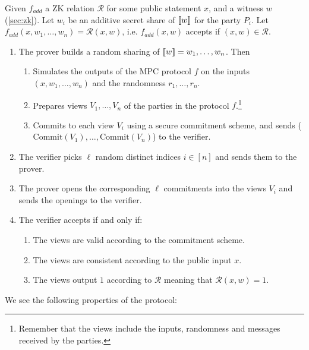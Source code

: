 \documentclass[11pt]{report}
\theoremstyle{definition}
\theoremstyle{plain}
\begin{document}
\begin{protocol}\label{def:mpcinth_basic}
  Given $f_{add}$ a ZK relation $\mathcal{R}$ for some public statement $x$, and a witness $w$ (\autoref{sec:zk}).
  Let $w_i$ be an additive secret share of $\llbracket w \rrbracket$ for the party $P_i$. Let $f_{add}(x, w_1, \dots, w_n) = \mathcal{R}(x, w)$, i.e. $f_{add}(x,w)$ accepts if $(x,w) \in \mathcal{R}$.

  \begin{enumerate}[parsep=2pt, itemsep=0pt]
    \item The prover builds a random sharing of $\llbracket w \rrbracket = w_1, \dots, w_n$. Then
          \begin{enumerate}[nolistsep]
            \item Simulates the outputs of the MPC protocol $f$ on the inputs $(x, w_1, \dots, w_n)$ and the randomness $r_1, \dots, r_n$.
            \item Prepares views $V_1, \dots, V_n$ of the parties in the protocol $f$.\footnote{Remember that the views include the inputs, randomness and messages received by the parties.}
            \item Commits to each view $V_i$ using a secure commitment scheme, and sends ($\text{Commit}(V_1), \dots, \text{Commit}(V_n)$) to the verifier.
          \end{enumerate}
    \item The verifier picks $\ell$ random distinct indices $i \in [n]$ and sends them to the prover.
    \item The prover opens the corresponding $\ell$ commitments into the views $V_i$ and sends the openings to the verifier.
    \item The verifier accepts if and only if:
          \begin{enumerate}[nolistsep]
            \item\label{prop:mpcinth_commit} The views are valid according to the commitment scheme.
            \item\label{prop:mpcinth_consistent} The views are consistent according to the public input $x$.
            \item\label{prop:mpcinth_knowledge} The views output $1$ according to $\mathcal{R}$ meaning that $\mathcal{R}(x,w) = 1$.
          \end{enumerate}
  \end{enumerate}
\end{protocol}

We see the following properties of the protocol:
\end{document}
